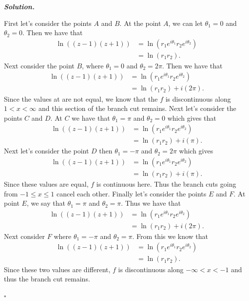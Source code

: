 \documentclass[12pt]{report}
\newenvironment{solution}[1][\it{Solution}]{\textbf{#1. } }{$\square$}
\begin{document}
\begin{solution}
\begin{enumerate}
        First let's consider the points $A$ and $B$. At the point $A$, we can let $\theta_1 = 0$ and $\theta_2 = 0$. Then we have that
        \begin{align*}
            \ln((z-1)(z+1)) &= \ln(r_1e^{i\theta_1}r_2e^{i\theta_2})\\
            &=\ln(r_1r_2).
        \end{align*}
        Next consider the point $B$, where $\theta_1 = 0$ and $\theta_2 = 2\pi$. Then we have that
        \begin{align*}
            \ln((z-1)(z+1)) &= \ln(r_1e^{i\theta_1}r_2e^{i\theta_2})\\
            &=\ln(r_1r_2) + i(2\pi).
        \end{align*}
        Since the values at are not equal, we know that the $f$ is discontinuous along $1 < x < \infty$ and this section of the branch cut remains. Next let's consider the points $C$ and $D$. At $C$ we have that $\theta_1 = \pi$ and $\theta_2 = 0$ which gives that
        \begin{align*}
            \ln((z-1)(z+1)) &= \ln(r_1e^{i\theta_1}r_2e^{i\theta_2})\\
            &=\ln(r_1r_2) + i(\pi).
        \end{align*}
        Next let's consider the point $D$ then $\theta_1 = -\pi$ and $\theta_2 = 2\pi$ which gives
        \begin{align*}
            \ln((z-1)(z+1)) &= \ln(r_1e^{i\theta_1}r_2e^{i\theta_2})\\
            &=\ln(r_1r_2) + i(\pi).
        \end{align*}
        Since these values are equal, $f$ is continuous here. Thus the branch cuts going from $-1 \leq x \leq 1$ cancel each other. Finally let's consider the points $E$ and $F$. At point $E$, we say that $\theta_1 = \pi$ and $\theta_2 = \pi$. Thus we have that
        \begin{align*}
            \ln((z-1)(z+1)) &= \ln(r_1e^{i\theta_1}r_2e^{i\theta_2})\\
            &=\ln(r_1r_2) + i(2\pi).
        \end{align*}
        Next consider $F$ where $\theta_1 = -\pi$ and $\theta_2 = \pi$. From this we know that 
        \begin{align*}
            \ln((z-1)(z+1)) &= \ln(r_1e^{i\theta_1}r_2e^{i\theta_2})\\
            &=\ln(r_1r_2).
        \end{align*}
        Since these two values are different, $f$ is discontinuous along $-\infty < x < -1$ and thus the branch cut remains.

    \end{enumerate}
\end{solution}

\newpage
\end{document}
